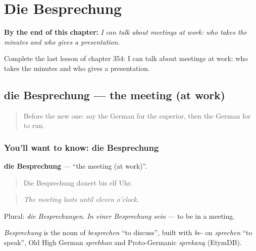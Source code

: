 
\chapter{Die Besprechung}
\label{ch:ge-die-besprechung}

\begin{chapteropening}
\textbf{By the end of this chapter:} \emph{I can talk about meetings at work: who takes the minutes and who gives a presentation.}

Complete the last lesson of chapter 354: I can talk about meetings at work: who takes the minutes and who gives a presentation.
\end{chapteropening}

\section[die Besprechung]{die Besprechung — the meeting (at work)}

\label{lesson:GE-C354-besprechung}



\begin{quote}
Before the new one: say the German for the superior, then the German for to run.
\end{quote}

\subsection*{You'll want to know: die Besprechung}
\textbf{die Besprechung} — \textquotedblleft{}the meeting (at work)\textquotedblright{}.

\begin{quote}
Die Besprechung dauert bis elf Uhr.
\end{quote}

\begin{quote}
\emph{The meeting lasts until eleven o'clock.}
\end{quote}

Plural: \emph{die Besprechungen}. \emph{In einer Besprechung sein} — to be in a meeting.

\begin{cousinweb}
\emph{Besprechung} is the noun of \emph{besprechen} \textquotedblleft{}to discuss\textquotedblright{}, built with \emph{be-} on \emph{sprechen} \textquotedblleft{}to speak\textquotedblright{}, Old High German \emph{sprehhan} and Proto-Germanic \emph{sprekaną} (EtymDB).
\end{cousinweb}

